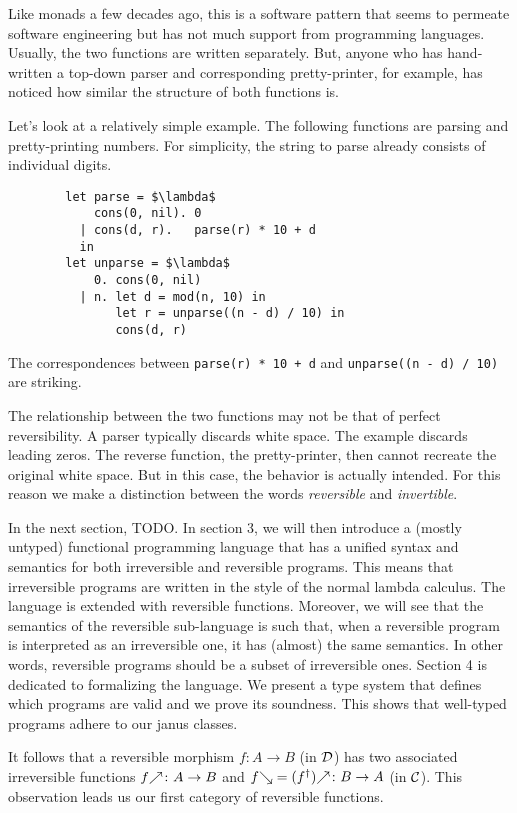 \documentclass[runningheads,envcountsame]{llncs}
\begin{document}
    Like monads a few decades ago, this is a software pattern that seems to permeate software engineering but has not much support from programming languages.
    Usually, the two functions are written separately.
    But, anyone who has hand-written a top-down parser and corresponding pretty-printer, for example, has noticed how similar the structure of both functions is. 
    
    Let's look at a relatively simple example. The following functions are parsing and pretty-printing numbers. For simplicity, the string to parse already consists of individual digits.
    \begin{lstlisting}
        let parse = $\lambda$ 
            cons(0, nil). 0
          | cons(d, r).   parse(r) * 10 + d
          in
        let unparse = $\lambda$
            0. cons(0, nil)
          | n. let d = mod(n, 10) in
               let r = unparse((n - d) / 10) in
               cons(d, r)
    \end{lstlisting}
    The correspondences between \lstinline|parse(r) * 10 + d| and \lstinline|unparse((n - d) / 10)| are striking.
    
    The relationship between the two functions may not be that of perfect reversibility.
    A parser typically discards white space.
    The example discards leading zeros.
    The reverse function, the pretty-printer, then cannot recreate the original white space.
    But in this case, the behavior is actually intended.
    For this reason we make a distinction between the words \emph{reversible} and \emph{invertible}.

    
    In the next section, TODO.
    In section 3, we will then introduce a (mostly untyped) functional programming language that has a unified syntax and semantics for both irreversible and reversible programs.
    This means that irreversible programs are written in the style of the normal lambda calculus.
    The language is extended with reversible functions.
    Moreover, we will see that the semantics of the reversible sub\hyp{}language is such that, when a reversible program is interpreted as an irreversible one, it has (almost) the same semantics.
    In other words, reversible programs should be a subset of irreversible ones.
    Section 4 is dedicated to formalizing the language. We present a type system that defines which programs are valid and we prove its soundness. This shows that well-typed programs adhere to our janus classes.

    It follows that a reversible morphism $f\colon A \to B$ (in $\mathcal{D}$) has two associated irreversible functions $\f{f}\colon A \to B$ and $\b{f} = \f{(\rev{f})}\colon B \to A$ (in $\mathcal{C}$). This observation leads us our first category of reversible functions.
\end{document}
